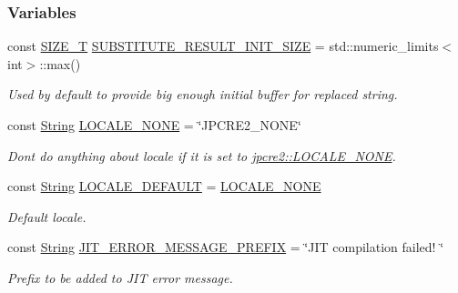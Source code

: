\subsubsection*{Variables}
\begin{DoxyCompactItemize}
\item 
const \hyperlink{namespacejpcre2_a2aac465ddcb123560c7c8215dd69246c}{S\+I\+Z\+E\+\_\+T} \hyperlink{namespacejpcre2_a80cb201f2e733137b22a8ed98465096a_a80cb201f2e733137b22a8ed98465096a}{S\+U\+B\+S\+T\+I\+T\+U\+T\+E\+\_\+\+R\+E\+S\+U\+L\+T\+\_\+\+I\+N\+I\+T\+\_\+\+S\+I\+ZE} = std\+::numeric\+\_\+limits$<$int$>$\+::max()
\begin{DoxyCompactList}\small\item\em Used by default to provide big enough initial buffer for replaced string. \end{DoxyCompactList}\item 
const \hyperlink{namespacejpcre2_a91f03070152fb228bc116c5a737f1d16}{String} \hyperlink{namespacejpcre2_ad2236dcdcc14d580724b256ce7f168e5_ad2236dcdcc14d580724b256ce7f168e5}{L\+O\+C\+A\+L\+E\+\_\+\+N\+O\+NE} = \char`\"{}J\+P\+C\+R\+E2\+\_\+\+N\+O\+NE\char`\"{}
\begin{DoxyCompactList}\small\item\em Don\textquotesingle{}t do anything about locale if it is set to \hyperlink{namespacejpcre2_ad2236dcdcc14d580724b256ce7f168e5_ad2236dcdcc14d580724b256ce7f168e5}{jpcre2\+::\+L\+O\+C\+A\+L\+E\+\_\+\+N\+O\+NE}. \end{DoxyCompactList}\item 
const \hyperlink{namespacejpcre2_a91f03070152fb228bc116c5a737f1d16}{String} \hyperlink{namespacejpcre2_adfdd3d1fff99e685734ae4e59771e84d_adfdd3d1fff99e685734ae4e59771e84d}{L\+O\+C\+A\+L\+E\+\_\+\+D\+E\+F\+A\+U\+LT} = \hyperlink{namespacejpcre2_ad2236dcdcc14d580724b256ce7f168e5_ad2236dcdcc14d580724b256ce7f168e5}{L\+O\+C\+A\+L\+E\+\_\+\+N\+O\+NE}
\begin{DoxyCompactList}\small\item\em Default locale. \end{DoxyCompactList}\item 
\hypertarget{namespacejpcre2_abf6c3bff9268a572c299958d334ff26e}{}\label{namespacejpcre2_abf6c3bff9268a572c299958d334ff26e} 
const \hyperlink{namespacejpcre2_a91f03070152fb228bc116c5a737f1d16}{String} \hyperlink{namespacejpcre2_abf6c3bff9268a572c299958d334ff26e}{J\+I\+T\+\_\+\+E\+R\+R\+O\+R\+\_\+\+M\+E\+S\+S\+A\+G\+E\+\_\+\+P\+R\+E\+F\+IX} = \char`\"{}J\+IT compilation failed! \char`\"{}
\begin{DoxyCompactList}\small\item\em Prefix to be added to J\+IT error message. \end{DoxyCompactList}\end{DoxyCompactItemize}


